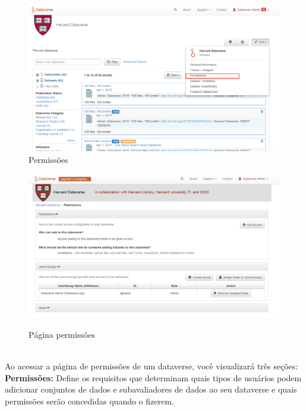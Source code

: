 \documentclass[12pt,hidelinks]{article}
\begin{document}
\newpage

\begin{figure}[H]
\caption{Permissões}
\centering
    \includegraphics[width=1.0\textwidth]{prt1.png}
    
    \label{Permissões}
\end{figure}

\begin{figure}[H]
\caption{Página permissões}
\centering
    \includegraphics[width=1.0\textwidth]{NOVOTIR.png}
    \label{Permissões 2}
\end{figure}
\\

Ao acessar a página de permissões de um dataverse, você visualizará três seções:\\

\textbf{Permissões:} Define os requisitos que determinam quais tipos de usuários podem adicionar conjuntos de dados e subavaliadores de dados ao seu dataverse e quais permissões serão concedidas quando o fizerem.\\
\end{document}
